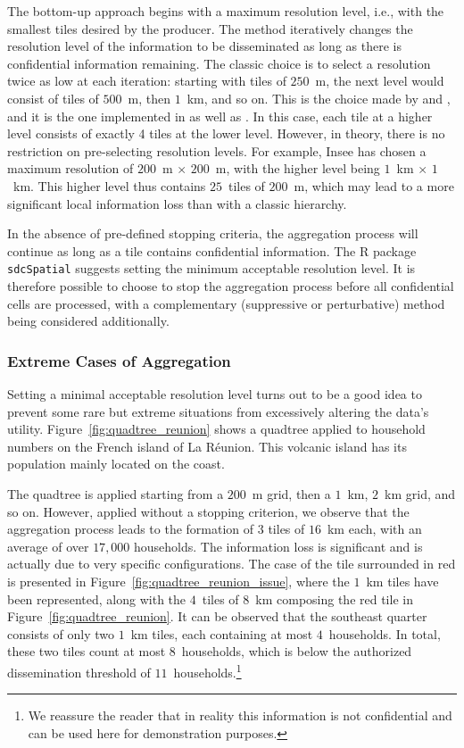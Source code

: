The bottom-up approach begins with a maximum resolution level, i.e., with the smallest tiles desired by the producer. The method iteratively changes the resolution level of the information to be disseminated as long as there is confidential information remaining. The classic choice is to select a resolution twice as low at each iteration: starting with tiles of $250$~m, the next level would consist of tiles of $500$~m, then $1$~km, and so on. This is the choice made by \citet{Behnisch_Meinel_Tramsen_Diesselmann_2013} and \citet{Lagonigro_Oller_Martori_2017}, and it is the one implemented in \citet{sdcSpatial_2022} as well as \citet{AQuadtree_2023}. In this case, each tile at a higher level consists of exactly 4 tiles at the lower level. However, in theory, there is no restriction on pre-selecting resolution levels. For example, Insee has chosen a maximum resolution of $200$~m $\times$ $200$~m, with the higher level being $1$~km $\times$ $1$~km. This higher level thus contains $25$~tiles of $200$~m, which may lead to a more significant local information loss than with a classic hierarchy.

In the absence of pre-defined stopping criteria, the aggregation process will continue as long as a tile contains confidential information. The R package \texttt{sdcSpatial} \citep{sdcSpatial_2022} suggests setting the minimum acceptable resolution level. It is therefore possible to choose to stop the aggregation process before all confidential cells are processed, with a complementary (suppressive or perturbative) method being considered additionally.

\subsubsection{Extreme Cases of Aggregation}

Setting a minimal acceptable resolution level turns out to be a good idea to prevent some rare but extreme situations from excessively altering the data's utility. Figure~\ref{fig:quadtree_reunion} shows a quadtree applied to household numbers on the French island of La Réunion. This volcanic island has its population mainly located on the coast. 

The quadtree is applied starting from a $200$~m grid, then a $1$~km, $2$~km grid, and so on. However, applied without a stopping criterion, we observe that the aggregation process leads to the formation of $3$ tiles of $16$~km each, with an average of over $17,000$ households. The information loss is significant and is actually due to very specific configurations. The case of the tile surrounded in red is presented in Figure~\ref{fig:quadtree_reunion_issue}, where the $1$~km tiles have been represented, along with the $4$~tiles of $8$~km composing the red tile in Figure~\ref{fig:quadtree_reunion}. It can be observed that the southeast quarter consists of only two $1$~km tiles, each containing at most $4$~households. In total, these two tiles count at most $8$~households, which is below the authorized dissemination threshold of $11$~households.\footnote{
    We reassure the reader that in reality this information is not confidential and can be used here for demonstration purposes.}

